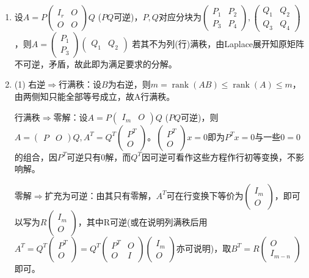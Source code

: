 \documentclass[a4paper,UTF8,fontset=windows]{ctexart}
\DeclareMathOperator{\rank}{rank}
\begin{document}
\begin{enumerate}
\item
设$A=P\begin{pmatrix}I_r&O\\O&O\end{pmatrix}Q$ ($PQ$可逆)，$P,Q$对应分块为$\begin{pmatrix}P_1&P_2\\P_3&P_4\end{pmatrix},\begin{pmatrix}Q_1&Q_2\\Q_3&Q_4\end{pmatrix}$，则$A=\begin{pmatrix}P_1\\P_3\end{pmatrix}\begin{pmatrix}Q_1&Q_2\end{pmatrix}$
若其不为列(行)满秩，由Laplace展开知原矩阵不可逆，矛盾，故此即为满足要求的分解。

\item
(1) 右逆$\Rightarrow$行满秩：设$B$为右逆，则$m=\rank(AB)\le\rank(A)\le m$，由两侧知只能全部等号成立，故A行满秩。

行满秩$\Rightarrow$零解：设$A=P\begin{pmatrix}I_m&O\end{pmatrix}Q$ ($PQ$可逆)，则$A=\begin{pmatrix}P&O\end{pmatrix}Q,A^T=Q^T\begin{pmatrix}P^T\\O\end{pmatrix}$。$\begin{pmatrix}P^T\\O\end{pmatrix}x=0$即为$P^Tx=0$与一些$0=0$的组合，因$P^T$可逆只有0解，而$Q^T$因可逆可看作这些方程作行初等变换，不影响解。

零解$\Rightarrow$扩充为可逆：由其只有零解，$A^T$可在行变换下等价为$\begin{pmatrix}I_m\\O\end{pmatrix}$，即可以写为$R\begin{pmatrix}I_m\\O\end{pmatrix}$，其中R可逆(或在说明列满秩后用$A^T=Q^T\begin{pmatrix}P^T\\O\end{pmatrix}=Q^T\begin{pmatrix}P^T&O\\O&I\end{pmatrix}\begin{pmatrix}I_m\\O\end{pmatrix}$亦可说明)，取$B^T=R\begin{pmatrix}O\\I_{m-n}\end{pmatrix}$即可。


\end{enumerate}
\end{document}
